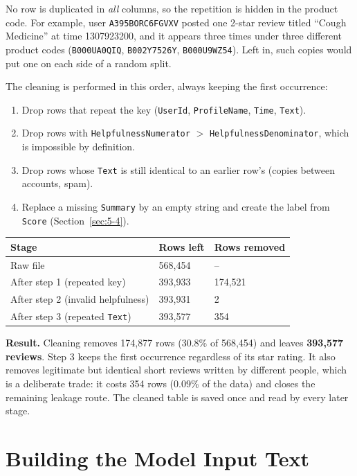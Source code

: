 No row is duplicated in \emph{all} columns, so the repetition is hidden in the product code. For example, user \texttt{A395BORC6FGVXV} posted one 2-star review titled ``Cough Medicine'' at time 1307923200, and it appears three times under three different product codes (\texttt{B000UA0QIQ}, \texttt{B002Y7526Y}, \texttt{B000U9WZ54}). Left in, such copies would put one on each side of a random split.

The cleaning is performed in this order, always keeping the first occurrence:
\begin{enumerate}
    \item Drop rows that repeat the key (\texttt{UserId}, \texttt{ProfileName}, \texttt{Time}, \texttt{Text}).
    \item Drop rows with \texttt{HelpfulnessNumerator} $>$ \texttt{HelpfulnessDenominator}, which is impossible by definition.
    \item Drop rows whose \texttt{Text} is still identical to an earlier row's (copies between accounts, spam).
    \item Replace a missing \texttt{Summary} by an empty string and create the label from \texttt{Score} (Section~\ref{sec:5-4}).
\end{enumerate}

\begin{center}
\begin{tabular}{@{}p{7cm}p{3cm}p{3cm}@{}}
    \toprule
    Stage & Rows left & Rows removed \\
    \midrule
    Raw file & 568{,}454 & -- \\
    After step 1 (repeated key) & 393{,}933 & 174{,}521 \\
    After step 2 (invalid helpfulness) & 393{,}931 & 2 \\
    After step 3 (repeated \texttt{Text}) & 393{,}577 & 354 \\
    \bottomrule
\end{tabular}
\end{center}

\textbf{Result.} Cleaning removes 174{,}877 rows (30.8\% of 568{,}454) and leaves \textbf{393{,}577 reviews}. Step 3 keeps the first occurrence regardless of its star rating. It also removes legitimate but identical short reviews written by different people, which is a deliberate trade: it costs 354 rows (0.09\% of the data) and closes the remaining leakage route. The cleaned table is saved once and read by every later stage.

\section{Building the Model Input Text}
\label{sec:5-3}

